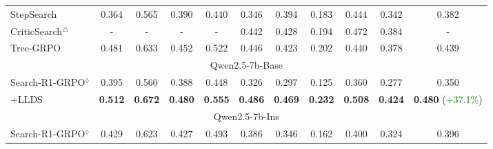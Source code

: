 \begin{table}[t]
{\begin{tabular}{l|ccc|c|cccc|c|c}
StepSearch
& 0.364 & 0.565 & 0.390 & 0.440
& 0.346 & 0.394 & 0.183 & 0.444 & 0.342 & 0.382 \\
CriticSearch$^{\triangle}$       & - & - & - & - & 0.442 & 0.428 & 0.194 & 0.472 & 0.384 & - \\
Tree-GRPO & 0.481 & 0.633 & 0.452 & 0.522 & 0.446 & 0.423 & 0.202 & 0.440 & 0.378 &  0.439\\
\midrule
\multicolumn{11}{c}{Qwen2.5-7b-Base} \\
\midrule
Search-R1-GRPO$^{\lozenge}$ & 0.395 & 0.560 & 0.388 & 0.448 & 0.326 & 0.297 & 0.125 & 0.360 & 0.277 & 0.350 \\
+LLDS       & \textbf{0.512} & \textbf{0.672} & \textbf{0.480} & \textbf{0.555} & \textbf{0.486} & \textbf{0.469} & \textbf{0.232} & \textbf{0.508} & \textbf{0.424} & \textbf{0.480} (\textcolor{green}{+37.1\%})   \\ 
\midrule
\multicolumn{11}{c}{Qwen2.5-7b-Ins} \\
\midrule
Search-R1-GRPO$^{\lozenge}$ & 0.429 & 0.623 & 0.427 & 0.493 & 0.386 & 0.346 & 0.162 & 0.400 & 0.324 & 0.396 \\

\end{tabular}}
\end{table}
